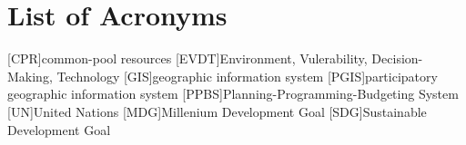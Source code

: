 \tableofcontents
\newpage
\listoffigures
\newpage
\listoftables
\newpage
\section*{List of Acronyms}

\begin{acronym}[HyperLEAVES] \itemsep0pt
[CPR]{common-pool resources}
[EVDT]{Environment, Vulerability, Decision-Making, Technology}
[GIS]{geographic information system}
[PGIS]{participatory geographic information system}
[PPBS]{Planning-Programming-Budgeting System}
[UN]{United Nations}
[MDG]{Millenium Development Goal}
[SDG]{Sustainable Development Goal}
\end{acronym}


